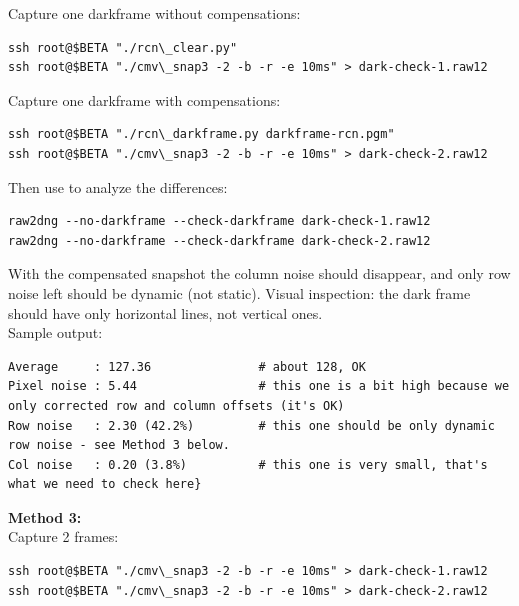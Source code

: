 Capture one darkframe without compensations: \\

\begin{lstlisting}[breaklines=true, breakatwhitespace=true]
ssh root@$BETA "./rcn\_clear.py"
ssh root@$BETA "./cmv\_snap3 -2 -b -r -e 10ms" > dark-check-1.raw12
\end{lstlisting} 

Capture one darkframe with compensations: \\

\begin{lstlisting}[breaklines=true, breakatwhitespace=true]
ssh root@$BETA "./rcn\_darkframe.py darkframe-rcn.pgm"
ssh root@$BETA "./cmv\_snap3 -2 -b -r -e 10ms" > dark-check-2.raw12 
\end{lstlisting} 

Then use  to analyze the differences: \\

\begin{lstlisting}[breaklines=true, breakatwhitespace=true]
raw2dng --no-darkframe --check-darkframe dark-check-1.raw12
raw2dng --no-darkframe --check-darkframe dark-check-2.raw12
\end{lstlisting} 

With the compensated snapshot the column noise should disappear, and only row noise left should be dynamic (not static). Visual inspection: the dark frame should have only horizontal lines, not vertical ones.\\

Sample output:\\ 

\begin{lstlisting}[breaklines=true, breakatwhitespace=true]
Average     : 127.36               # about 128, OK
Pixel noise : 5.44                 # this one is a bit high because we only corrected row and column offsets (it's OK)
Row noise   : 2.30 (42.2%)         # this one should be only dynamic row noise - see Method 3 below.
Col noise   : 0.20 (3.8%)          # this one is very small, that's what we need to check here}
\end{lstlisting} 


\textbf{Method 3:}\\

Capture 2 frames: \\

\begin{lstlisting}[breaklines=true, breakatwhitespace=true]
ssh root@$BETA "./cmv\_snap3 -2 -b -r -e 10ms" > dark-check-1.raw12 
ssh root@$BETA "./cmv\_snap3 -2 -b -r -e 10ms" > dark-check-2.raw12 
\end{lstlisting} 

